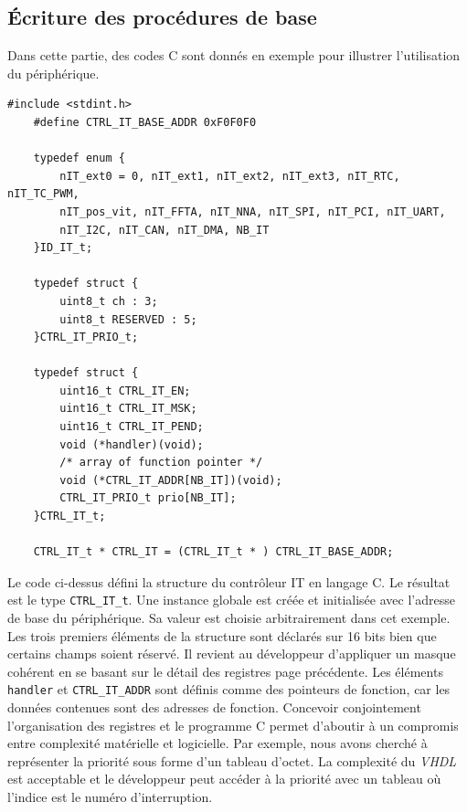 \subsection{Écriture des procédures de base}
Dans cette partie, des codes C sont donnés en exemple pour illustrer l'utilisation du périphérique.
\begin{lstlisting}[style=CStyle]
	#include <stdint.h>
	#define CTRL_IT_BASE_ADDR 0xF0F0F0
	
	typedef enum {
		nIT_ext0 = 0, nIT_ext1, nIT_ext2, nIT_ext3, nIT_RTC, nIT_TC_PWM,
		nIT_pos_vit, nIT_FFTA, nIT_NNA,	nIT_SPI, nIT_PCI, nIT_UART,
		nIT_I2C, nIT_CAN, nIT_DMA, NB_IT
	}ID_IT_t;
	
	typedef struct {
		uint8_t ch : 3;
		uint8_t RESERVED : 5;
	}CTRL_IT_PRIO_t;

	typedef struct {
		uint16_t CTRL_IT_EN;	
		uint16_t CTRL_IT_MSK;	
		uint16_t CTRL_IT_PEND;	
		void (*handler)(void);  
		/* array of function pointer */
		void (*CTRL_IT_ADDR[NB_IT])(void);
		CTRL_IT_PRIO_t prio[NB_IT];
	}CTRL_IT_t;
	
	CTRL_IT_t * CTRL_IT = (CTRL_IT_t * ) CTRL_IT_BASE_ADDR;
\end{lstlisting}
Le code ci-dessus défini la structure du contrôleur IT en langage C. 
Le résultat est le type \texttt{CTRL\_IT\_t}. 
Une instance globale est créée et initialisée avec l'adresse de base du périphérique.
Sa valeur est choisie arbitrairement dans cet exemple.
Les trois premiers éléments de la structure sont déclarés sur 16 bits bien que certains champs soient réservé.
Il revient au développeur d'appliquer un masque cohérent en se basant sur le détail des registres page précédente.
Les éléments \texttt{handler} et \texttt{CTRL\_IT\_ADDR} sont définis comme des pointeurs de fonction, car les données contenues sont des adresses de fonction.
Concevoir conjointement l'organisation des registres et le programme C permet d'aboutir à un compromis entre complexité matérielle et logicielle.
Par exemple, nous avons cherché à représenter la priorité sous forme d'un tableau d'octet.
La complexité du \textit{VHDL} est acceptable et le développeur peut accéder à la priorité avec un tableau où l'indice est le numéro d'interruption.
\newpage


